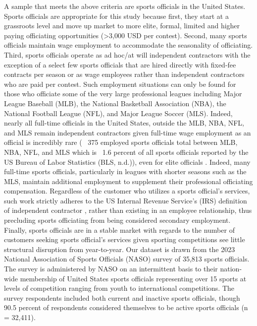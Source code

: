 \documentclass{article}
\begin{document}
A sample that meets the above criteria are sports officials in the United States. Sports officials are appropriate for this study because first, they start at a grassroots level and move up market to more elite, formal, limited and higher paying officiating opportunities (>3,000 USD per contest).  Second, many sports officials maintain wage employment to accommodate the seasonality of officiating. Third, sports officials operate as ad hoc/at will independent contractors with the exception of a select few sports officials that are hired directly with fixed-fee contracts per season or as wage employees rather than independent contractors who are paid per contest.  Such employment situations can only be found for those who officiate some of the very large professional leagues including Major League Baseball (MLB), the National Basketball Association (NBA), the National Football League (NFL), and Major League Soccer (MLS).  Indeed, nearly all full-time officials in the United States, outside the MLB, NBA, NFL, and MLS remain independent contractors given full-time wage employment as an official is incredibly rare (~ 375 employed sports officials total between MLB, NBA, NFL, and MLS which is ~1.6 percent of all sports officials reported by the US Bureau of Labor Statistics (BLS, n.d.)), even for elite officials \cite{lengermann2015adjunct, lewis1999after}.  Indeed, many full-time sports officials, particularly in leagues with shorter seasons such as the MLS, maintain additional employment to supplement their professional officiating compensation.  Regardless of the customer who utilizes a sports official’s services, such work strictly adheres to the US Internal Revenue Service’s (IRS) definition  of independent contractor \cite{irs2024independent}, rather than existing in an employee relationship, thus precluding sports officiating from being considered secondary employment.  Finally, sports officials are in a stable market with regards to the number of customers seeking sports official’s services given sporting competitions see little structural disruption from year-to-year.  
Our dataset is drawn from the 2023 National Association of Sports Officials (NASO) survey of 35,813 sports officials. The survey is administered by NASO on an intermittent basis to their nation-wide membership of United States sports officials representing over 15 sports at levels of competition ranging from youth to international competitions.  The survey respondents included both current and inactive sports officials, though 90.5 percent of respondents considered themselves to be active sports officials (n = 32,411). 
\end{document}
